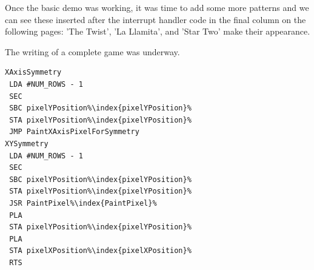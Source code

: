 Once the basic demo was working, it was time to add some more patterns and we can see these inserted after the interrupt handler
code in the final column on the following pages: 'The Twist', 'La Llamita', and 'Star Two' make their appearance.

The writing of a complete game was underway.

\clearpage
\begin{minipage}[b]{0.33\linewidth}
\begin{lrbox}{\mybox}%
\begin{lstlisting}[basicstyle=\ttfamily\tiny,escapechar=\%]
XAxisSymmetry
 LDA #NUM_ROWS - 1
 SEC
 SBC pixelYPosition%\index{pixelYPosition}%
 STA pixelYPosition%\index{pixelYPosition}%
 JMP PaintXAxisPixelForSymmetry
XYSymmetry
 LDA #NUM_ROWS - 1
 SEC
 SBC pixelYPosition%\index{pixelYPosition}%
 STA pixelYPosition%\index{pixelYPosition}%
 JSR PaintPixel%\index{PaintPixel}%
 PLA
 STA pixelYPosition%\index{pixelYPosition}%
 PLA
 STA pixelXPosition%\index{pixelXPosition}%
 RTS


\end{lstlisting}
\end{lrbox}
\end{minipage}
